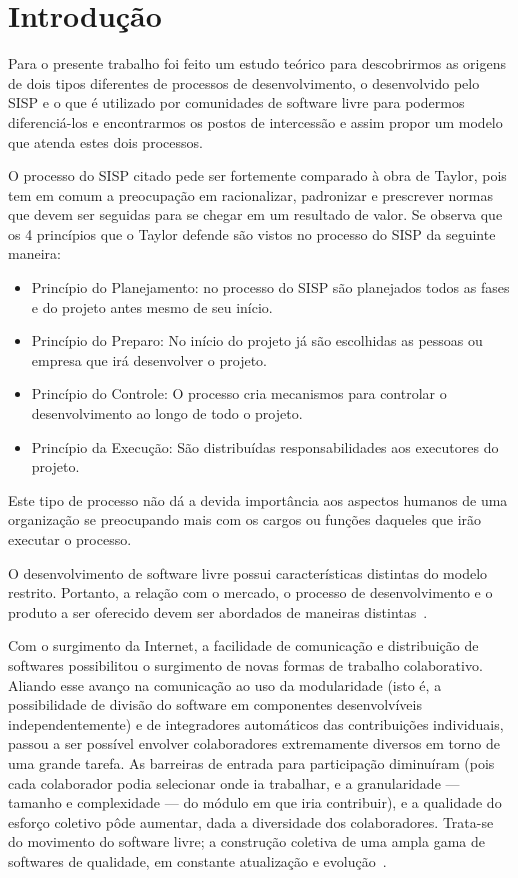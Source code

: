 \chapter{Introdução}

Para o presente trabalho foi feito um estudo teórico para descobrirmos as origens
de dois tipos diferentes de processos de desenvolvimento, o desenvolvido pelo 
SISP e o que é utilizado por comunidades de software livre para podermos diferenciá-los
e encontrarmos os postos de intercessão e assim propor um modelo que atenda estes dois 
processos.

O processo do SISP citado pede ser fortemente comparado à obra de Taylor, pois 
tem em comum a preocupação em racionalizar, padronizar e prescrever normas que
devem ser seguidas para se chegar em um resultado de valor.
%
Se observa que os 4 princípios que o Taylor defende são vistos no processo do SISP
da seguinte maneira: 
\begin{itemize}
\item Princípio do Planejamento: no processo do SISP são planejados todos as fases
e do projeto antes mesmo de seu início.
\item Princípio do Preparo: No início do projeto já são escolhidas as pessoas 
ou empresa que irá desenvolver o projeto.
\item Princípio do Controle: O processo cria mecanismos para controlar o desenvolvimento
ao longo de todo o projeto.
\item Princípio da Execução: São distribuídas responsabilidades aos executores do projeto. 
\end{itemize}

Este tipo de processo não dá a devida importância aos aspectos humanos de uma organização
se preocupando mais com os cargos ou funções daqueles que irão executar o processo.

O desenvolvimento de software livre possui características distintas do modelo restrito. Portanto,
a relação com o mercado, o processo de desenvolvimento e o produto a ser oferecido devem ser
abordados de maneiras distintas~\cite{meirelles2013metrics}.

Com o surgimento da Internet, a facilidade de comunicação e distribuição de 
softwares possibilitou o surgimento de novas formas de trabalho colaborativo.
Aliando esse avanço na comunicação ao uso da modularidade (isto é, a possibilidade 
de divisão do software em componentes desenvolvíveis independentemente) e de 
integradores automáticos das contribuições individuais, passou a ser possível 
envolver colaboradores extremamente diversos em torno de uma grande tarefa. 
As barreiras de entrada para participação diminuíram (pois cada colaborador podia 
selecionar onde ia trabalhar, e a granularidade — tamanho e complexidade — do módulo 
em que iria contribuir), e a qualidade do esforço coletivo pôde aumentar, dada a 
diversidade dos colaboradores. Trata-se do movimento do software livre; 
a construção coletiva de uma ampla gama de softwares de qualidade, em constante 
atualização e evolução~\cite{simon2010rossio}.

